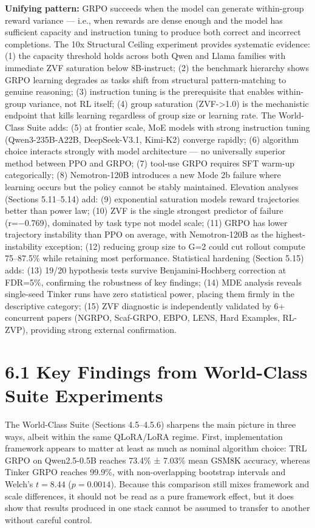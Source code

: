 \documentclass[
  american,
  11pt,
  a4paper,
  oneside]{report}
\begin{document}
\textbf{Unifying pattern:} GRPO succeeds when the model can generate
within-group reward variance --- i.e., when rewards are dense enough and
the model has sufficient capacity and instruction tuning to produce both
correct and incorrect completions. The 10x Structural Ceiling experiment
provides systematic evidence: (1) the capacity threshold holds across
both Qwen and Llama families with immediate ZVF saturation below
8B-instruct; (2) the benchmark hierarchy shows GRPO learning degrades as
tasks shift from structural pattern-matching to genuine reasoning; (3)
instruction tuning is the prerequisite that enables within-group
variance, not RL itself; (4) group saturation (ZVF-\textgreater1.0) is
the mechanistic endpoint that kills learning regardless of group size or
learning rate. The World-Class Suite adds: (5) at frontier scale, MoE
models with strong instruction tuning (Qwen3-235B-A22B, DeepSeek-V3.1,
Kimi-K2) converge rapidly; (6) algorithm choice interacts strongly with
model architecture --- no universally superior method between PPO and
GRPO; (7) tool-use GRPO requires SFT warm-up categorically; (8)
Nemotron-120B introduces a new Mode 2b failure where learning occurs but
the policy cannot be stably maintained. Elevation analyses (Sections
5.11--5.14) add: (9) exponential saturation models reward trajectories
better than power law; (10) ZVF is the single strongest predictor of
failure (r=−0.769), dominated by task type not model scale; (11) GRPO
has lower trajectory instability than PPO on average, with Nemotron-120B
as the highest-instability exception; (12) reducing group size to G=2
could cut rollout compute 75--87.5\% while retaining most performance.
Statistical hardening (Section 5.15) adds: (13) 19/20 hypothesis tests
survive Benjamini-Hochberg correction at FDR=5\%, confirming the
robustness of key findings; (14) MDE analysis reveals single-seed Tinker
runs have zero statistical power, placing them firmly in the descriptive
category; (15) ZVF diagnostic is independently validated by 6+
concurrent papers (NGRPO, Scaf-GRPO, EBPO, LENS, Hard Examples, RL-ZVP),
providing strong external confirmation.

\section{6.1 Key Findings from World-Class Suite
Experiments}\label{key-findings-from-world-class-suite-experiments}

The World-Class Suite (Sections 4.5--4.5.6) sharpens the main picture in
three ways, albeit within the same QLoRA/LoRA regime. First,
implementation framework appears to matter at least as much as nominal
algorithm choice: TRL GRPO on Qwen2.5-0.5B reaches 73.4\% ± 7.03\% mean
GSM8K accuracy, whereas Tinker GRPO reaches 99.9\%, with non-overlapping
bootstrap intervals and Welch's \(t=8.44\) (\(p=0.0014\)). Because this
comparison still mixes framework and scale differences, it should not be
read as a pure framework effect, but it does show that results produced
in one stack cannot be assumed to transfer to another without careful
control.
\end{document}
